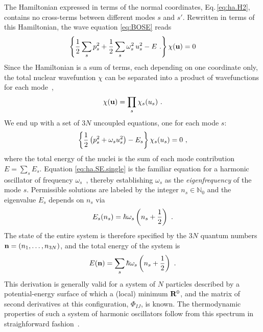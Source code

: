 The Hamiltonian expressed in terms of the normal coordinates, Eq.\,\eqref{eq:ha.H2}, contains no cross-terms between different modes $s$ and $s'$. Rewritten in terms of this Hamiltonian, the wave equation \eqref{eq:BOSE} reads
\begin{align}
	\left\{
		\halb \sum_s p_s^2 + \halb \sum_{s} \omega_s^2	\, u_s^2 - E~.
	\right\} \chi ({\bf u})
	= 0
	\label{eq:ha.SE.2}
\end{align}
Since the Hamiltonian is a sum of terms, each depending on one coordinate only, the total nuclear wavefuntion $\chi$ can be separated into a product of wavefunctions for each mode~\cite[p.\,175]{BornHuang},
\begin{align}
	\chi({\bf u}) = \prod_{s} \chi_s (u_s)~.
	\label{eq:ha.chi}
\end{align}
We end up with a set of $3N$ uncoupled equations, one for each mode $s$:
\begin{align}
	\left\{	\halb \left( p_s^2 + \omega_s u_s^2 \right)	- E_s	\right\} \chi_s (u_s)
		= 0~,
	\label{eq:ha.SE.single}
\end{align}
where the total energy of the nuclei is the sum of each mode contribution $E = \sum_s E_s$. Equation \eqref{eq:ha.SE.single} is the familiar equation for a harmonic oscillator of frequency $\omega_s$~\cite{Dirac1981}, thereby establishing $\omega_s$ as the \emph{eigenfrequency} of the mode $s$. Permissible solutions are labeled by the integer $n_s \in \mathds N_0$ and the eigenvalue $E_s$ depends on $n_s$ via
\begin{align}
	E_s(n_s) = \hbar \omega_s \left( n_s + \halb \right)~.
	\label{eq:E_s}
\end{align}
The state of the entire system is therefore specified by the $3N$ quantum numbers ${\bf n} = (n_1, \ldots, n_{3N})$, and the total energy of the system is
\begin{align}
	E ({\bf n}) = \sum_s \hbar \omega_s \left( n_s + \frac{1}{2} \right)~.
\end{align}
This derivation is generally valid for a system of $N$ particles described by a potential-energy surface of which a (local) minimum ${\bf R}^0$, and the matrix of second derivatives at this configuration, $\Phi_{IJ}$, is known. The thermodynamic properties of such a system of harmonic oscillators follow from this spectrum in straighforward fashion~\cite{BornHuang}.

\newpage


